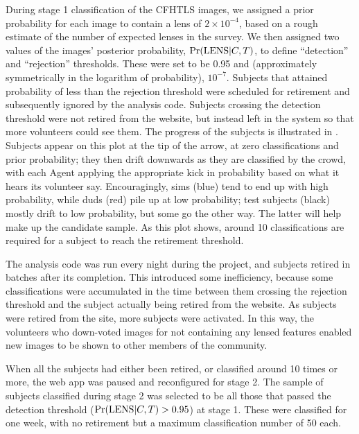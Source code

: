 \documentclass[useAMS,usenatbib,a4paper]{mn2e}
\begin{document}
During stage 1 classification of the CFHTLS images, we assigned a prior
probability for each image to contain a lens of $2\times10^{-4}$, based on a
rough estimate of the number of expected lenses in the survey. We then
assigned two values of the images' posterior probability, ${\rm Pr}({\rm LENS}|C,T)$, to
define ``detection'' and ``rejection'' thresholds. These were set to be 0.95
and (approximately symmetrically in the logarithm of probability), $10^{-7}$.
Subjects that attained probability of less than the rejection threshold were
scheduled for retirement and subsequently ignored by the analysis code.
Subjects crossing the detection threshold were not retired from the website,
but instead left in the system so that more volunteers could see them. The
progress of the subjects is illustrated in .
Subjects appear on this plot at the tip of the arrow, at zero classifications
and prior probability; they then drift downwards as they are classified by the
crowd, with each Agent applying the appropriate kick in probability based on
what it hears its volunteer say. Encouragingly, sims (blue) tend to end up
with high probability, while duds (red) pile up at low probability; test
subjects (black) mostly drift to low probability, but some go the other way.
The latter will help make up the candidate sample. As this plot shows, around
10 classifications are required for a subject to reach the retirement
threshold.

The analysis code was run every night during the project, and subjects retired
in batches after its completion. This introduced some inefficiency, because
some classifications were accumulated in the time between them crossing the
rejection threshold and the subject actually being retired from the website.
As subjects were retired from the site, more subjects were activated. In this
way, the volunteers who down-voted images for not containing any lensed
features enabled new images to be shown to other members of the community.

When all the subjects had either been retired, or classified around 10 times
or more, the web app was paused and reconfigured for stage 2. The sample of
subjects classified during stage 2 was selected to be all those that passed
the detection threshold (${\rm Pr}({\rm LENS}|C,T) > 0.95$) at stage 1. These were
classified for one week, with no retirement but a maximum classification
number of 50 each. 

\end{document}
